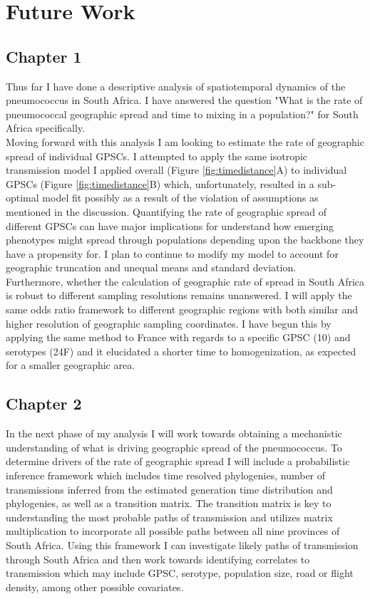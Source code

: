 \documentclass{article}
\begin{document}
\section{Future Work}
\subsection{Chapter 1}
Thus far I have done a descriptive analysis of spatiotemporal dynamics of the pneumococcus in South Africa. I have answered the question "What is the rate of pneumococcal geographic spread and time to mixing in a population?" for South Africa specifically. \\Moving forward with this analysis I am looking to estimate the rate of geographic spread of individual GPSCs. I attempted to apply the same isotropic transmission model I applied overall (Figure \ref{fig:timedistance}A) to individual GPSCs (Figure \ref{fig:timedistance}B)  which, unfortunately, resulted in a sub-optimal model fit possibly as a result of the violation of assumptions as mentioned in the discussion. Quantifying the rate of geographic spread of different GPSCs can have major implications for understand how emerging phenotypes might spread through populations depending upon the backbone they have a propensity for. I plan to continue to modify my model to account for geographic truncation and unequal means and standard deviation.\\ Furthermore, whether the calculation of geographic rate of spread in South Africa is robust to different sampling resolutions remains unanswered. I will apply the same odds ratio framework to different geographic regions with both similar and higher resolution of geographic sampling coordinates. I have begun this by applying the same method to France with regards to a specific GPSC (10) and serotypes (24F) and it elucidated a shorter time to homogenization, as expected for a smaller geographic area. 
\subsection{Chapter 2}
In the next phase of my analysis I will work towards obtaining a mechanistic understanding of what is driving geographic spread of the pneumococcus. To determine drivers of the rate of geographic spread I will include a probabilistic inference framework which includes time resolved phylogenies, number of transmissions inferred from the estimated generation time distribution and phylogenies, as well as a transition matrix. The transition matrix is key to understanding the most probable paths of transmission and utilizes matrix multiplication to incorporate all possible paths between all nine provinces of South Africa. Using this framework I can investigate likely paths of transmission through South Africa and then work towards identifying correlates to transmission which may include GPSC, serotype, population size, road or flight density, among other possible covariates\cite{saljeReconstructingUnseenTransmission2020a}.
\end{document}
